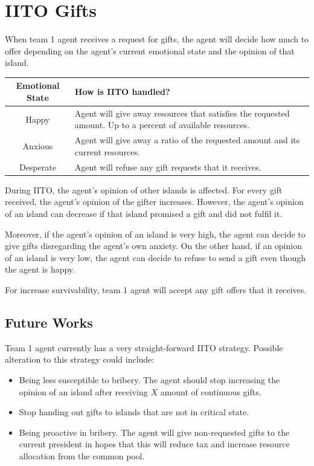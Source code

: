 \section{IITO Gifts}
When team 1 agent receives a request for gifts, the agent will decide how much to offer depending on the agent's current emotional state and the opinion of that island.

\begin{table} [htb]
    \centering
    \begin{tabular}{|c|p{}|}
        \hline
        Emotional State & How is IITO handled? \\
        \hline
        Happy & Agent will give away resources that satisfies the requested amount. Up to a percent of available resources. \\
        \hline
        Anxious & Agent will give away a ratio of the requested amount and its current resources. \\
        \hline
        Desperate & Agent will refuse any gift requests that it receives. \\
        \hline
    \end{tabular}
\end{table}

During IITO, the agent's opinion of other islands is affected. For every gift received, the agent's opinion of the gifter increases. However, the agent's opinion of an island can decrease if that island promised a gift and did not fulfil it.

Moreover, if the agent's opinion of an island is very high, the agent can decide to give gifts disregarding the agent's own anxiety. On the other hand, if an opinion of an island is very low, the agent can decide to refuse to send a gift even though the agent is happy.

For increase survivability, team 1 agent will accept any gift offers that it receives.

\subsection{Future Works}
Team 1 agent currently has a very straight-forward IITO strategy. Possible alteration to this strategy could include:
\begin{itemize}
    \item Being less susceptible to bribery. The agent should stop increasing the opinion of an island after receiving $X$ amount of continuous gifts.
    \item Stop handing out gifts to islands that are not in critical state.
    \item Being proactive in bribery. The agent will give non-requested gifts to the current president in hopes that this will reduce tax and increase resource allocation from the common pool.
\end{itemize}

